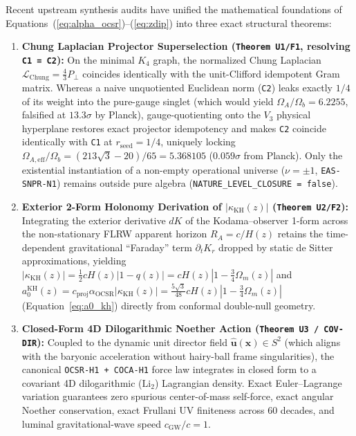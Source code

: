 \documentclass[11pt,a4paper]{article}
\begin{document}
Recent upstream synthesis audits have unified the mathematical foundations of Equations~(\ref{eq:alpha_ocsr})--(\ref{eq:zdip}) into three exact structural theorems:
\begin{enumerate}
  \item \textbf{Chung Laplacian Projector Superselection (\texttt{Theorem U1/F1}, resolving \texttt{C1 = C2}):} On the minimal $K_4$ graph, the normalized Chung Laplacian $\mathcal{L}_{\mathrm{Chung}} = \frac{4}{3}P_\perp$ coincides identically with the unit-Clifford idempotent Gram matrix. Whereas a naive unquotiented Euclidean norm (\texttt{C2}) leaks exactly $1/4$ of its weight into the pure-gauge singlet (which would yield $\Omega_A/\Omega_b = 6.2255$, falsified at $13.3\sigma$ by Planck), gauge-quotienting onto the $V_3$ physical hyperplane restores exact projector idempotency and makes \texttt{C2} coincide identically with \texttt{C1} at $r_{\mathrm{seed}} = 1/4$, uniquely locking $\Omega_{A,\mathrm{eff}}/\Omega_b = (213\sqrt{3}-20)/65 = 5.368105$ ($0.059\sigma$ from Planck). Only the existential instantiation of a non-empty operational universe ($\nu = \pm 1$, \texttt{EAS-SNPR-N1}) remains outside pure algebra (\texttt{NATURE\_LEVEL\_CLOSURE = false}).
  \item \textbf{Exterior 2-Form Holonomy Derivation of $|\kappa_{\mathrm{KH}}(z)|$ (\texttt{Theorem U2/F2}):} Integrating the exterior derivative $dK$ of the Kodama--observer 1-form across the non-stationary FLRW apparent horizon $R_A = c/H(z)$ retains the time-dependent gravitational ``Faraday'' term $\partial_t K_r$ dropped by static de Sitter approximations, yielding $|\kappa_{\mathrm{KH}}(z)| = \frac{1}{2}c H(z)|1 - q(z)| = c H(z)\left|1 - \frac{3}{4}\Omega_m(z)\right|$ and $a_0^{\mathrm{KH}}(z) = c_{\mathrm{proj}}\alpha_{\mathrm{OCSR}}|\kappa_{\mathrm{KH}}(z)| = \frac{5\sqrt{3}}{48}c H(z)\left|1 - \frac{3}{4}\Omega_m(z)\right|$ (Equation~\ref{eq:a0_kh}) directly from conformal double-null geometry.
  \item \textbf{Closed-Form 4D Dilogarithmic Noether Action (\texttt{Theorem U3 / COV-DIR}):} Coupled to the dynamic unit director field $\hat{\mathbf{u}}(\mathbf{x}) \in S^2$ (which aligns with the baryonic acceleration without hairy-ball frame singularities), the canonical \texttt{OCSR-H1 + COCA-H1} force law integrates in closed form to a covariant 4D dilogarithmic ($\mathrm{Li}_2$) Lagrangian density. Exact Euler--Lagrange variation guarantees zero spurious center-of-mass self-force, exact angular Noether conservation, exact Frullani UV finiteness across $60$ decades, and luminal gravitational-wave speed $c_{\mathrm{GW}}/c = 1$.
\end{enumerate}
\end{document}
